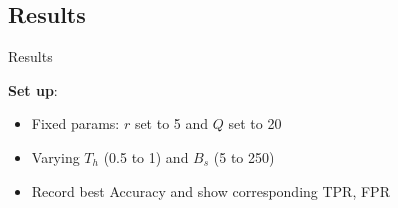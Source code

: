 \subsection{Results}
\begin{frame}{Results}

\centering
\begin{minipage}[t]{0.7\linewidth}
\textbf{Set up}:
    \begin{itemize}
        \item Fixed params: $r$ set to 5 and $Q$ set to 20
        \item Varying $T_h$ (0.5 to 1) and $B_s$ (5 to 250)
        \item Record best Accuracy and show corresponding TPR, FPR
    \end{itemize}
\end{minipage}

\smallskip


\end{frame}
